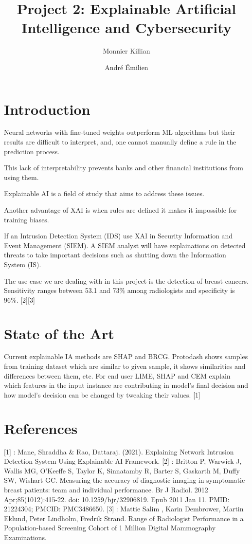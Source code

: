 \documentclass{article}
\author{Monnier Killian\and André Émilien}
\title{Project 2: Explainable Artificial Intelligence and Cybersecurity}
\begin{document}
\maketitle
\section{Introduction}
Neural networks with fine-tuned weights outperform ML algorithms but their results are difficult to interpret, and, one cannot manually define a rule in the prediction process.\par
This lack of interpretability prevents banks and other financial institutions from using them.\par
Explainable AI is a field of study that aims to address these issues.\par
Another advantage of XAI is when rules are defined it makes it impossible for training biases.\par
If an Intrusion Detection System (IDS) use XAI in Security Information and Event Management (SIEM). A SIEM analyst will have explainations on detected threats to take important decisions such as shutting down the Information System (IS).\par
The use case we are dealing with in this project is the detection of breast cancers. Sensitivity ranges between 53.1 and 73\% among radiologists and specificity is 96\%. [2][3]
\section{State of the Art}
Current explainable IA methods are SHAP and BRCG. Protodash shows samples from training dataset which are similar to given sample, it shows similarities and differences between them, etc. For end user LIME, SHAP and CEM explain which features in the input instance are contributing in model's final decision and how model's decision can be changed by tweaking their values. [1]
\section{References}
[1] : Mane, Shraddha \& Rao, Dattaraj. (2021). Explaining Network Intrusion
Detection System Using Explainable AI Framework.
[2] : Britton P, Warwick J, Wallis MG, O'Keeffe S, Taylor K, Sinnatamby R, Barter S, Gaskarth M, Duffy SW, Wishart GC. Measuring the accuracy of diagnostic imaging in symptomatic breast patients: team and individual performance. Br J Radiol. 2012 Apr;85(1012):415-22. doi: 10.1259/bjr/32906819. Epub 2011 Jan 11. PMID: 21224304; PMCID: PMC3486650.
[3] : Mattie Salim , Karin Dembrower, Martin Eklund, Peter Lindholm, Fredrik Strand. Range of Radiologist Performance in a Population-based Screening Cohort of 1 Million Digital Mammography Examinations.
\end{document}
